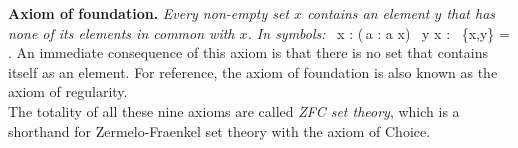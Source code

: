 \textbf{Axiom of foundation.} \emph{Every non-empty
set $x$ contains an element $y$ that has none of its elements in common with
$x$. In symbols:}
\bse
\forall \, x : (\exists \,a : a \in x) \imp \exists \, y \in x : \bigcap \,
\{x,y\} = \vn .
\ese
An immediate consequence of this axiom is that there is no set that contains
itself as an element. For reference, the axiom of foundation is also known as
the axiom of regularity.\\

The totality of all these nine axioms are called \emph{ZFC set theory}, which
is a shorthand for Zermelo-Fraenkel set theory with the axiom of Choice.

